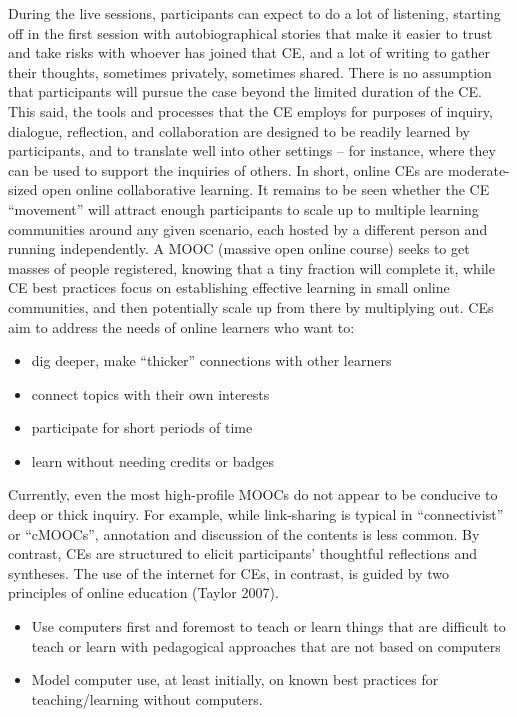 During the live sessions, participants can expect to do a lot of
listening, starting off in the first session with autobiographical
stories that make it easier to trust and take risks with whoever has
joined that CE, and a lot of writing to gather their thoughts,
sometimes privately, sometimes shared. There is no assumption that
participants will pursue the case beyond the limited duration of the
CE. This said, the tools and processes that the CE employs for
purposes of inquiry, dialogue, reflection, and collaboration are
designed to be readily learned by participants, and to translate well
into other settings -- for instance, where they can be used to support
the inquiries of others. In short, online CEs are moderate-sized open
online collaborative learning. It remains to be seen whether the CE
``movement'' will attract enough participants to scale up to multiple
learning communities around any given scenario, each hosted by a
different person and running independently. A MOOC (massive open
online course) seeks to get masses of people registered, knowing that
a tiny fraction will complete it, while CE best practices focus on
establishing effective learning in small online communities, and then
potentially scale up from there by multiplying out. CEs aim to address
the needs of online learners who want to:

\begin{itemize}
\itemsep1pt\parskip0pt
\item
  dig deeper, make ``thicker'' connections with other learners
\item
  connect topics with their own interests
\item
  participate for short periods of time
\item
  learn without needing credits or badges
\end{itemize}

Currently, even the most high-profile MOOCs do not appear to be
conducive to deep or thick inquiry. For example, while link-sharing is
typical in ``connectivist'' or ``cMOOCs'', annotation and discussion of
the contents is less common. By contrast, CEs are structured to elicit
participants' thoughtful reflections and syntheses. The use of the
internet for CEs, in contrast, is guided by two principles of online
education (Taylor 2007).

\begin{itemize}
\itemsep1pt\parskip0pt
\item
  Use computers first and foremost to teach or learn things that are
  difficult to teach or learn with pedagogical approaches that are not
  based on computers
\item
  Model computer use, at least initially, on known best practices for
  teaching/learning without computers.
\end{itemize}

